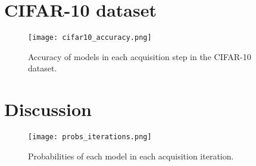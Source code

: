 \section{CIFAR-10 dataset}

\begin{figure}[H]
    \centering
    \texttt{[image: cifar10\_accuracy.png]}
    \caption{Accuracy of models in each acquisition step in the CIFAR-10 dataset.}
    \label{fig:cifar10_comparison_active_learning_random}
\end{figure}

\section{Discussion}

\begin{figure}[H]
    \centering
    \texttt{[image: probs\_iterations.png]}
    \caption{Probabilities of each model in each acquisition iteration.}
    \label{fig:probs_iterations}
\end{figure}
